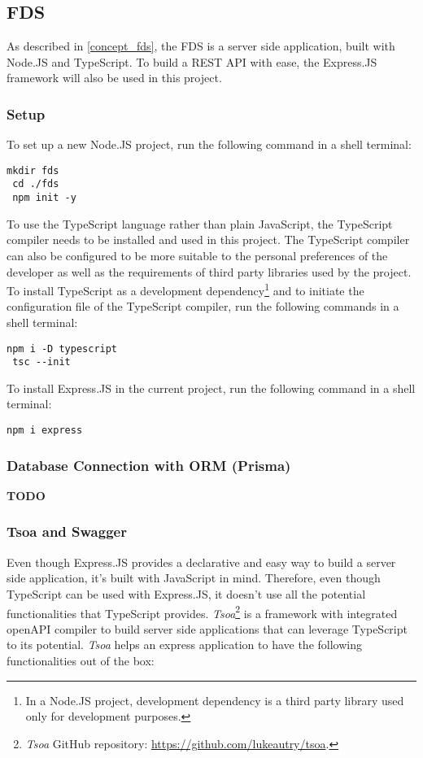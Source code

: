  \subsection{FDS}
 As described in \autoref{concept_fds}, the FDS is a server side application, built with Node.JS and TypeScript. To build a REST API with ease, the Express.JS framework will also be used in this project. 

  \subsubsection{Setup}
  To set up a new Node.JS project, run the following command in a shell terminal:

   \begin{lstlisting}[caption={Creating a new Node.JS program (Shell)}]
 mkdir fds
 cd ./fds
 npm init -y
   \end{lstlisting}
   
  To use the TypeScript language rather than plain JavaScript, the TypeScript compiler needs to be installed and used in this project. The TypeScript compiler can also be configured to be more suitable to the personal preferences of the developer as well as the requirements of third party libraries used by the project. To install TypeScript as a development dependency\footnote{In a Node.JS project, development dependency is a third party library used only for development purposes.} and to initiate the configuration file of the TypeScript compiler, run the following commands in a shell terminal:
  
   \begin{lstlisting}[caption={Installing and configuring TypeScript compiler (Shell)}]
 npm i -D typescript
 tsc --init
   \end{lstlisting}
  
  To install Express.JS in the current project, run the following command in a shell terminal:
  
   \begin{lstlisting}[caption={Installing Express.JS (Shell)}]
 npm i express
   \end{lstlisting}
  
  \subsubsection{Database Connection with ORM (Prisma)}
  \textbf{TODO}
  
  \subsubsection{Tsoa and Swagger}
  Even though Express.JS provides a declarative and easy way to build a server side application, it's built with JavaScript in mind. Therefore, even though TypeScript can be used with Express.JS, it doesn't use all the potential functionalities that TypeScript provides. \emph{Tsoa}\footnote{\emph{Tsoa} GitHub repository: \url{https://github.com/lukeautry/tsoa}.} is a framework with integrated openAPI compiler to build server side applications that can leverage TypeScript to its potential. \emph{Tsoa} helps an express application to have the following functionalities out of the box:

